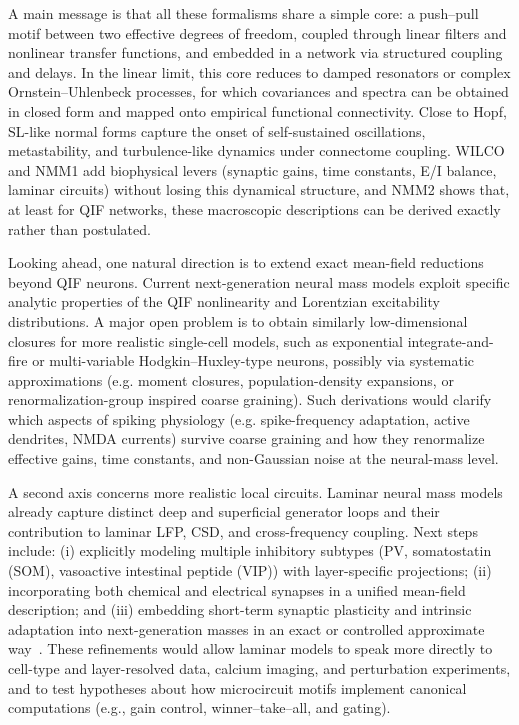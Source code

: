 \documentclass[12pt]{article}
\numberwithin{equation}{section}
\begin{document}
A main message is that all these formalisms share a simple core: a push–pull motif between two effective degrees of freedom, coupled through linear filters and nonlinear transfer functions, and embedded in a network via structured coupling and delays. In the linear limit, this core reduces to damped resonators or complex Ornstein–Uhlenbeck processes, for which covariances and spectra can be obtained in closed form and mapped onto empirical functional connectivity.\cite{ponce-alvarezHopfWholebrainModel2024,Nozari2024} Close to Hopf, SL-like normal forms capture the onset of self-sustained oscillations, metastability, and turbulence-like dynamics under connectome coupling.\cite{decoTurbulentlikeDynamicsHuman2020,cabralMetastableOscillatoryModes2022,Escrichs2022Turbulence} WILCO and NMM1 add biophysical levers (synaptic gains, time constants, E/I balance, laminar circuits) without losing this dynamical structure, and NMM2 shows that, at least for QIF networks, these macroscopic descriptions can be derived exactly rather than postulated.

Looking ahead, one natural direction is to extend exact mean-field reductions beyond QIF neurons. Current next-generation neural mass models exploit specific analytic properties of the QIF nonlinearity and Lorentzian excitability distributions.\cite{montbrioMacroscopicDescriptionNetworks2015,coombesNextGenerationNeural2019} A major open problem is to obtain similarly low-dimensional closures for more realistic single-cell models, such as exponential integrate-and-fire or multi-variable Hodgkin–Huxley-type neurons, possibly via systematic approximations (e.g. moment closures, population-density expansions, or renormalization-group inspired coarse graining).\cite{nykampPopulationDensityApproach2000,buiceSystematicFluctuationExpansion2010,Goldobin2021} Such derivations would clarify which aspects of spiking physiology (e.g. spike-frequency adaptation, active dendrites, NMDA currents) survive coarse graining and how they renormalize effective gains, time constants, and non-Gaussian noise at the neural-mass level.

A second axis concerns more realistic local circuits. Laminar neural mass models already capture distinct deep and superficial generator loops and their contribution to laminar LFP, CSD, and cross-frequency coupling.\cite{sanchez-todoPhysicalNeuralMass2023,Ruffini2020P118} Next steps include: (i) explicitly modeling multiple inhibitory subtypes (PV, somatostatin (SOM), vasoactive intestinal peptide (VIP)) with layer-specific projections; (ii) incorporating both chemical and electrical synapses in a unified mean-field description; and (iii) embedding short-term synaptic plasticity and intrinsic adaptation into next-generation masses in an exact or controlled approximate way~\cite{Devalle:2017aa,taherExactNeuralMass2020,chenExactMeanfieldModels2022}. These refinements would allow laminar models to speak more directly to cell-type and layer-resolved data, calcium imaging, and perturbation experiments, and to test hypotheses about how microcircuit motifs implement canonical computations (e.g., gain control, winner–take–all, and gating).
\end{document}

